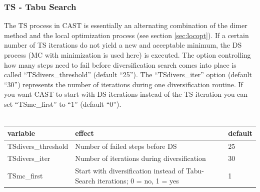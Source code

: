 \documentclass[10pt,a4paper]{article} %
\begin{document}
	\subsubsection{TS - Tabu Search}
	The \acf{TS} process in \ac{CAST} is essentially an alternating combination of the dimer method\cite{dimermethod} and the local optimization process (see section \ref{sec:locopt}).
	If a certain number of \ac{TS} iterations do not yield a new and acceptable minimum, the \acf{DS} process (\ac{MC} with minimization is used here) is executed. The option controlling how many steps need to fail before diversification search comes into place is called ``TSdivers\_threshold'' (default ``25'').
	The ``TSdivers\_iter'' option (default ``30'') represents the number of iterations during one diversification routine.
	If you want \ac{CAST} to start with \ac{DS} iterations instead of the \ac{TS} iteration you can set ``TSmc\_first'' to ``1'' (default ``0'').\\~\\
	
	\begin{tabularx}{\textwidth}{l|X|X}
		variable & effect & default \\
		\hline
		TSdivers\_threshold & Number of failed steps before \acl{DS} & 25 \\
		TSdivers\_iter & Number of iterations during diversification & 30 \\
		TSmc\_first & Start with diversification instead of Tabu-Search iterations; 0 = no, 1 = yes & 1 \\
	\end{tabularx}
	\\~\\
\end{document}

